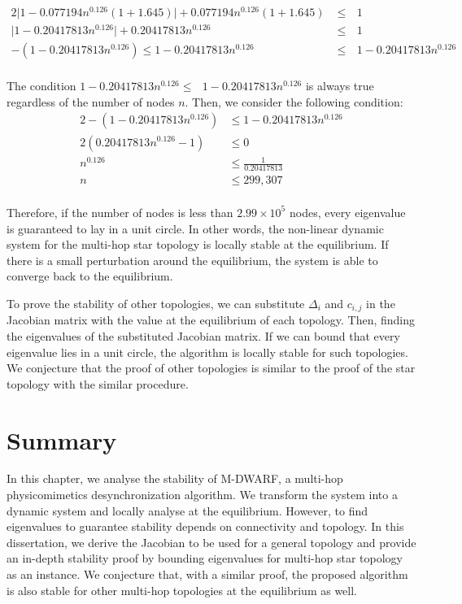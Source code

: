 \begin{alignat}{2}
\Bigg|1 - 0.077194n^{0.126}(1+ 1.645)\Bigg| +0.077194n^{0.126}(1+1.645) &\leq \text{ } 1 \nonumber \\
\Bigg|1 - 0.20417813n^{0.126}\Bigg| + 0.20417813n^{0.126} &\leq \text{ } 1 \nonumber \\
- (1 - 0.20417813n^{0.126}) \leq 1 - 0.20417813n^{0.126}  &\leq \text{ } 1 - 0.20417813n^{0.126}\nonumber \\
\end{alignat}

The condition $1 - 0.20417813n^{0.126}  \leq \text{ } 1 - 0.20417813n^{0.126}$ is always true regardless of the number of nodes $n$. Then, we consider the following condition:
\begin{alignat}{2}
- (1 - 0.20417813n^{0.126}) &\leq 1 - 0.20417813n^{0.126} \nonumber \\
2(0.20417813n^{0.126} - 1) &\leq 0 \nonumber \\
n^{0.126}  &\leq \frac{1}{0.20417813} \nonumber \\
n  &\leq 299,307 \nonumber \\
\end{alignat} 

Therefore, if the number of nodes is less than $2.99 \times 10^5$ nodes, every eigenvalue is guaranteed to lay in a unit circle. In other words, the non-linear dynamic system for the multi-hop star topology is locally stable at the equilibrium.
If there is a small perturbation around the equilibrium, the system is able to converge back to the equilibrium.

To prove the stability of other topologies, we can substitute $\Delta_i$ and $c_{i,j}$ in the Jacobian matrix with the value at the equilibrium of each topology. Then, finding the eigenvalues of the substituted Jacobian matrix. If we can bound that every eigenvalue lies in a unit circle, the algorithm is locally stable for such topologies. We conjecture that the proof of other topologies is similar to the proof of the star topology with the similar procedure.
 
\section{Summary}
In this chapter, we analyse the stability of M-DWARF, a multi-hop physicomimetics desynchronization algorithm. 
We transform the system into a dynamic system and locally analyse at the equilibrium. 
However, to find eigenvalues to guarantee stability depends on connectivity and topology. 
In this dissertation, we derive the Jacobian to be used for a general topology and provide an in-depth stability proof by bounding eigenvalues for multi-hop star topology as an instance. We conjecture that, with a similar proof, the proposed algorithm is also stable for other multi-hop topologies at the equilibrium as well.



